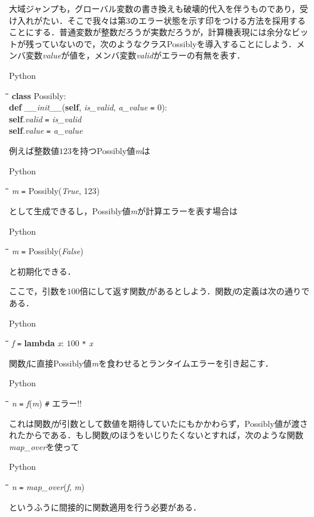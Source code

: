 \documentclass[twocolumn]{jsbook}
\newenvironment{pythoncode}{\begin{itembox}[r]{Python}}{\end{itembox}}
\newenvironment{python}{\begin{tabbing}\hspace*{1em}\=\hspace*{1em}\=\hspace*{1em}\=\hspace*{1em}\=\kill}{\end{tabbing}}
\newcommand{\pthnClassname}[1]{\textrm{#1}}
\newcommand{\pthnId}[1]{\textit{#1}}
\newcommand{\pthnKeyword}[1]{\textbf{#1}}
\newcommand{\pthnOp}[1]{\texttt{#1}}
\begin{document}
大域ジャンプも，グローバル変数の書き換えも破壊的代入を伴うものであり，受け入れがたい．そこで我々は第3のエラー状態を示す印をつける方法を採用することにする．普通変数が整数だろうが実数だろうが，計算機表現には余分なビットが残っていないので，次のようなクラス\pthnClassname{Possibly}を導入することにしよう．メンバ変数\pthnId{value}が値を，メンバ変数\pthnId{valid}がエラーの有無を表す．
\begin{pythoncode}
\begin{python}
\pthnKeyword{class} \pthnClassname{Possibly}:\\
\>\pthnKeyword{def} \pthnId{\_\_init\_\_}(\pthnKeyword{self}, \pthnId{is\_valid}, \pthnId{a\_value} \pthnOp{=} $0$):\\
\>\>\pthnKeyword{self}.\pthnId{valid} \pthnOp{=} \pthnId{is\_valid}\\
\>\>\pthnKeyword{self}.\pthnId{value} \pthnOp{=} \pthnId{a\_value}
\end{python}
\end{pythoncode}

例えば整数値$123$を持つPossibly値\pthnId{m}は
\begin{pythoncode}
\begin{python}
\pthnId{m} \pthnOp{=} \pthnClassname{Possibly}(\pthnId{True}, 123)
\end{python}
\end{pythoncode}
として生成できるし，\pthnClassname{Possibly}値\pthnId{m}が計算エラーを表す場合は
\begin{pythoncode}
\begin{python}
\pthnId{m} \pthnOp{=} \pthnClassname{Possibly}(\pthnId{False})
\end{python}
\end{pythoncode}
と初期化できる．

ここで，引数を$100$倍にして返す関数\pthnId{f}があるとしよう．関数\pthnId{f}の定義は次の通りである．
\begin{pythoncode}
\begin{python}
\pthnId{f} \pthnOp{=} \pthnKeyword{lambda} \pthnId{x}: $100$ \pthnOp{*} \pthnId{x}
\end{python}
\end{pythoncode}

関数\pthnId{f}に直接\pthnClassname{Possibly}値\pthnId{m}を食わせるとランタイムエラーを引き起こす．
\begin{pythoncode}
\begin{python}
\pthnId{n} \pthnOp{=} \pthnId{f}(\pthnId{m}) \texttt{\#} エラー!! 
\end{python}
\end{pythoncode}
これは関数\pthnId{f}が引数として数値を期待していたにもかかわらず，\pthnClassname{Possibly}値が渡されたからである．もし関数\pthnId{f}のほうをいじりたくないとすれば，次のような関数\pthnId{map\_over}を使って
\begin{pythoncode}
\begin{python}
\pthnId{n} \pthnOp{=} \pthnId{map\_over}(\pthnId{f}, \pthnId{m}) 
\end{python}
\end{pythoncode}
というふうに間接的に関数適用を行う必要がある．
\end{document}
